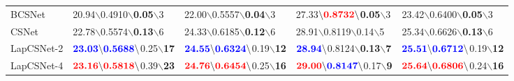 \documentclass{article}
\begin{document}
\begin{table*}[!t]
\begin{small}
\begin{tabular}{>{\hfil}p{55pt}<{\hfil}|>{\hfil}p{98pt}<{\hfil}|>{\hfil}p{98pt}<{\hfil}|
    >{\hfil}p{98pt}<{\hfil}|>{\hfil}p{98pt}<{\hfil}}
BCSNet~\cite{adler2016deep}            & 20.94$\backslash$0.4910$\backslash$\textbf{\color{red}0.05}$\backslash$3	&	22.00$\backslash$0.5557$\backslash$\textbf{\color{red}0.04}$\backslash$3	& 27.33$\backslash\textbf{\color{red}0.8732}\backslash$\textbf{\color{red}0.05}$\backslash$3    &  23.42$\backslash$0.6400$\backslash$\textbf{\color{red}0.05}$\backslash$3  	  \\


    CSNet~\cite{shi2017deep}            & 22.78$\backslash$0.5574$\backslash$\textbf{\color{blue}0.13}$\backslash$6	&	24.33$\backslash$0.6185$\backslash$\textbf{\color{blue}0.12}$\backslash$6	& 28.91$\backslash$0.8119$\backslash$0.14$\backslash$5    &  25.34$\backslash$0.6626$\backslash$\textbf{\color{blue}0.13}$\backslash$6  	  \\
LapCSNet-2           & $\textbf{\color{blue}23.03}\backslash\textbf{\color{blue}0.5688}\backslash$0.25$\backslash$\textbf{\color{blue}17}    &   $\textbf{\color{blue}24.55}\backslash\textbf{\color{blue}0.6324}\backslash$0.19$\backslash$\textbf{\color{blue}12}  & $\textbf{\color{blue}28.94}\backslash$0.8124$\backslash$\textbf{\color{blue}0.13}$\backslash$\textbf{\color{blue}7}    &  $\textbf{\color{blue}25.51}\backslash\textbf{\color{blue}0.6712}\backslash$0.19$\backslash$\textbf{\color{blue}12}     \\

LapCSNet-4           & $\textbf{\color{red}23.16}\backslash\textbf{\color{red}0.5818}\backslash$0.39$\backslash$\textbf{\color{red}23}    &   $\textbf{\color{red}24.76}\backslash\textbf{\color{red}0.6454}\backslash$0.25$\backslash$\textbf{\color{red}16}  & $\textbf{\color{red}29.00}\backslash\textbf{\color{blue}0.8147}\backslash$0.17$\backslash$\textbf{\color{red}9}    &  $\textbf{\color{red}25.64}\backslash\textbf{\color{red}0.6806}\backslash$0.24$\backslash$\textbf{\color{red}16}     \\

    \hline
    \end{tabular}
    \end{small}
\end{table*}
\end{document}
